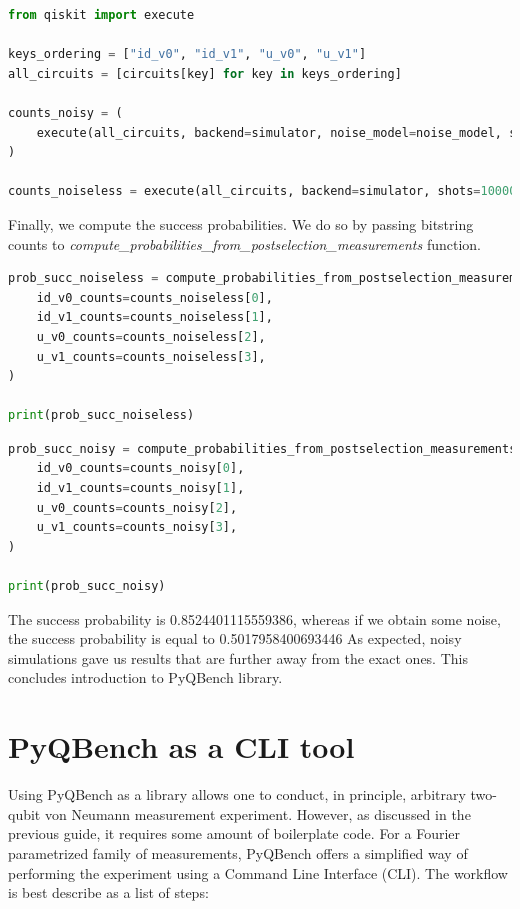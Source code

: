 \documentclass[preprint,12pt, a4paper, dvipsnames]{elsarticle}
\newcommand{\1}{{\rm 1\hspace{-0.9mm}l}}
\begin{document}
\begin{lstlisting}[language=Python, caption=Running  circuits]
from qiskit import execute

keys_ordering = ["id_v0", "id_v1", "u_v0", "u_v1"]
all_circuits = [circuits[key] for key in keys_ordering]

counts_noisy = (
	execute(all_circuits, backend=simulator, noise_model=noise_model, shots=10000).result().get_counts()
)

counts_noiseless = execute(all_circuits, backend=simulator, shots=10000).result().get_counts()
\end{lstlisting}
Finally, we compute the success probabilities. We do so by passing bitstring counts to  \textit{compute\_probabilities\_from\_postselection\_measurements} function.


\begin{lstlisting}[language=Python, caption=Computation probability without noise]
prob_succ_noiseless = compute_probabilities_from_postselection_measurements(
	id_v0_counts=counts_noiseless[0],
	id_v1_counts=counts_noiseless[1],
	u_v0_counts=counts_noiseless[2],
	u_v1_counts=counts_noiseless[3],
)

print(prob_succ_noiseless)
\end{lstlisting}

\begin{lstlisting}[language=Python, caption=Computation probability including noise]
prob_succ_noisy = compute_probabilities_from_postselection_measurements(
	id_v0_counts=counts_noisy[0],
	id_v1_counts=counts_noisy[1],
	u_v0_counts=counts_noisy[2],
	u_v1_counts=counts_noisy[3],
)

print(prob_succ_noisy)
\end{lstlisting}
The success probability is 0.8524401115559386, whereas if we obtain some noise, the success probability is equal to 0.5017958400693446
As expected, noisy simulations gave us results that are further away from the exact ones.
This concludes introduction to PyQBench library.



 
 
\section{PyQBench as a CLI tool}\label{sec:pyqbench-as-cli}
Using PyQBench as a library allows one to conduct, in principle, arbitrary two-qubit von Neumann measurement experiment. However, as discussed in the previous guide, it requires some amount of boilerplate code.
For a Fourier parametrized family of measurements, PyQBench offers a simplified way of performing the experiment using a Command Line Interface (CLI).
The workflow is best describe as a list of steps:
\end{document}
